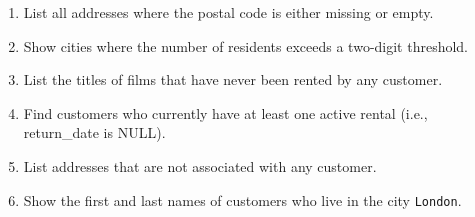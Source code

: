\documentclass[12pt,a4paper]{article}
\newif\ifshowsolutions
\begin{document}
\begin{enumerate}

\item List all addresses where the postal code is either missing or empty.
\ifshowsolutions
\begin{lstlisting}[language=SQL]
SELECT address_id, address, city_id
FROM address
WHERE postal_code IS NULL OR postal_code = '';
\end{lstlisting}
\fi

\item Show cities where the number of residents exceeds a two-digit threshold.
\ifshowsolutions
\begin{lstlisting}[language=SQL]
SELECT ci.city, COUNT(c.customer_id) AS customer_count
FROM customer c
JOIN address a ON c.address_id = a.address_id
JOIN city ci ON a.city_id = ci.city_id
GROUP BY ci.city
HAVING COUNT(c.customer_id) > 99;
\end{lstlisting}
\fi

\item List the titles of films that have never been rented by any customer.
\ifshowsolutions
\begin{lstlisting}[language=SQL]
SELECT f.title
FROM film f
WHERE f.film_id NOT IN (
    SELECT DISTINCT i.film_id
    FROM inventory i
    JOIN rental r ON i.inventory_id = r.inventory_id
);
\end{lstlisting}
\fi

\item Find customers who currently have at least one active rental (i.e., return\_date is NULL).
\ifshowsolutions
\begin{lstlisting}[language=SQL]
SELECT DISTINCT c.first_name, c.last_name
FROM customer c
JOIN rental r ON c.customer_id = r.customer_id
WHERE r.return_date IS NULL;
\end{lstlisting}
\fi

\item List addresses that are not associated with any customer.
\ifshowsolutions
\begin{lstlisting}[language=SQL]
SELECT a.address_id, a.address
FROM address a
LEFT JOIN customer c ON a.address_id = c.address_id
WHERE c.customer_id IS NULL;
\end{lstlisting}
\fi

\item Show the first and last names of customers who live in the city \texttt{London}.
\ifshowsolutions
\begin{lstlisting}[language=SQL]
SELECT c.first_name, c.last_name
FROM customer c
JOIN address a ON c.address_id = a.address_id
JOIN city ci ON a.city_id = ci.city_id
WHERE ci.city = 'London';
\end{lstlisting}
\fi


\end{enumerate}
\end{document}
